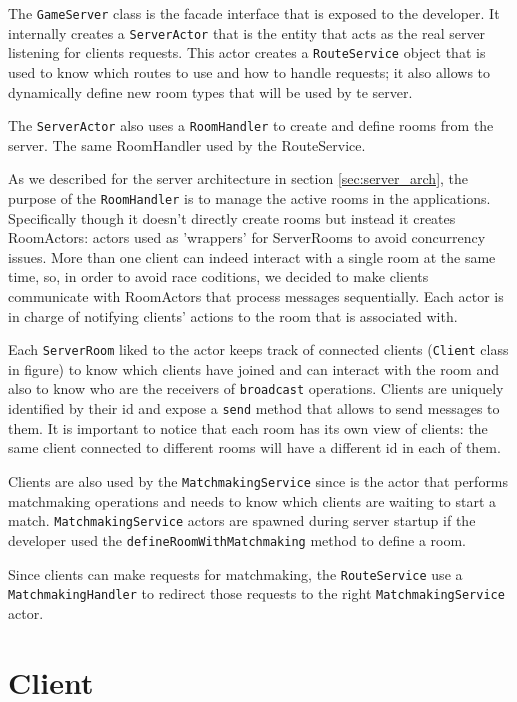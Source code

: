 The \texttt{GameServer} class is the facade interface that is exposed to the developer. It internally creates a \texttt{ServerActor} that is the entity that acts as the real server listening for clients requests. This actor creates a \texttt{RouteService} object that is used to know which routes to use and how to handle requests; it also allows to dynamically define new room types that will be used by te server. 

The \texttt{ServerActor} also uses a \texttt{RoomHandler} to create and define rooms from the server. The same RoomHandler used by the RouteService.

As we described for the server architecture in section \ref{sec:server_arch}, the purpose of the \texttt{RoomHandler} is to manage the active rooms in the applications. Specifically though it doesn't directly create rooms but instead it creates RoomActors: actors used as 'wrappers' for ServerRooms to avoid concurrency issues.  More than one client can indeed interact with a single room at the same time, so, in order to avoid race coditions, we decided to make clients communicate with RoomActors that process messages sequentially. Each actor is in charge of notifying clients' actions to the room that is associated with.

Each \texttt{ServerRoom} liked to the actor keeps track of connected clients (\texttt{Client} class in figure) to know which clients have joined and can interact with the room and also to know who are the receivers of \texttt{broadcast} operations. Clients are uniquely identified by their id and expose a \texttt{send} method that allows to send messages to them. It is important to notice that each room has its own view of clients: the same client connected to different rooms will have a different id in each of them. 

Clients are also used by the \texttt{MatchmakingService} since is the actor that performs matchmaking operations and needs to know which clients are waiting to start a match. \texttt{MatchmakingService} actors are spawned during server startup if the developer used the \texttt{defineRoomWithMatchmaking} method to define a room. 

Since clients can make requests for matchmaking, the \texttt{RouteService} use a \texttt{MatchmakingHandler} to redirect those requests to the right \texttt{MatchmakingService} actor.


\section{Client}

